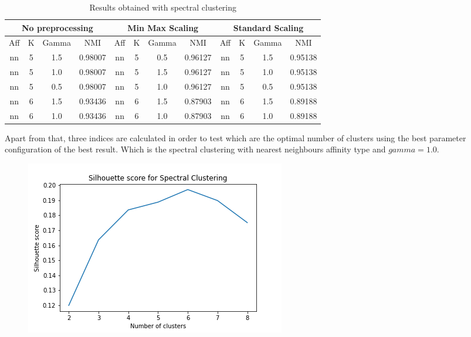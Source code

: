\documentclass[12pt]{article}
\begin{document}
\begin{table}[h]
\centering
\begin{tabular}{|ccc|c|ccc|l|ccc|l|}
\hline
\multicolumn{4}{|c|}{No preprocessing} & \multicolumn{4}{c|}{Min Max Scaling}                 & \multicolumn{4}{c|}{Standard Scaling}                \\ \hline
Aff  & K  & Gamma  & NMI     & Aff & K & Gamma & \multicolumn{1}{c|}{NMI} & Aff & K & Gamma & \multicolumn{1}{c|}{NMI} \\ \hline
nn             & 5  & 1.5    & 0.98007 & nn            & 5 & 0.5   & 0.96127                  & nn            & 5 & 1.5   & 0.95138                  \\
nn             & 5  & 1.0    & 0.98007 & nn            & 5 & 1.5   & 0.96127                  & nn            & 5 & 1.0   & 0.95138                  \\
nn             & 5  & 0.5    & 0.98007 & nn            & 5 & 1.0   & 0.96127                  & nn            & 5 & 0.5   & 0.95138                  \\
nn             & 6  & 1.5    & 0.93436 & nn            & 6 & 1.5   & 0.87903                  & nn            & 6 & 1.5   & 0.89188                  \\
nn             & 6  & 1.0    & 0.93436 & nn            & 6 & 1.0   & 0.87903                  & nn            & 6 & 1.0   & 0.89188                  \\ \hline
\end{tabular}
\caption{Results obtained with spectral clustering}
\label{res:spectal}
\end{table}

Apart from that, three indices are calculated in order to test which are the optimal number of clusters using the best parameter configuration of the best result. Which is the spectral clustering with nearest neighbours affinity type and $gamma=1.0$. 

\begin{figure}[h]
    \centering
    \includegraphics[scale=0.4]{best-ss.png}
\end{figure}
\end{document}
